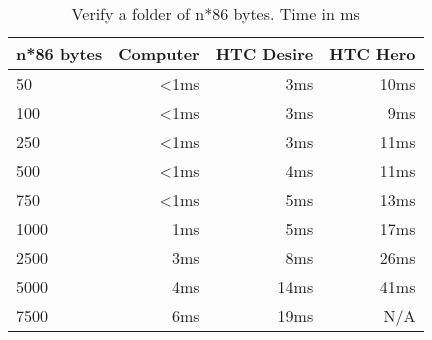 \begin{table}
  \centering
  \caption{Verify a folder of n*86 bytes. Time in ms}
  \begin{tabular}{ | l | r | r | r |}
    \hline
    \textbf{n*86 bytes} & \textbf{Computer} & \textbf{HTC Desire} & \textbf{HTC Hero} \\ \hline
    50      & <1ms    &3ms  & 10ms    \\ \hline
    100     & <1ms    &3ms  &  9ms    \\ \hline
    250     & <1ms    &3ms  & 11ms    \\ \hline   
    500     & <1ms    &4ms  & 11ms    \\ \hline
    750     & <1ms    &5ms  & 13ms    \\ \hline
    1000    &  1ms    &5ms  & 17ms    \\ \hline
    2500    &  3ms    &8ms  & 26ms    \\ \hline     
    5000    &  4ms    &14ms & 41ms    \\ \hline 
    7500    &  6ms    &19ms & N/A   \\ \hline 
  \end{tabular}
  \label{tbl:folder:verify}
\end{table}
